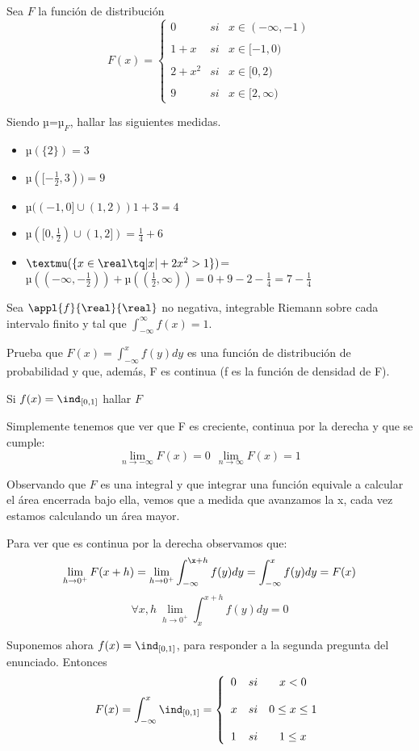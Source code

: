 \begin{problem}
Sea $F$ la función de distribución
\[F(x)=\left\{ \begin{array}{lcc}
             0 &   si  & x \in (-\infty, -1) \\
             \\ 1+x & si & x \in [-1, 0) \\
             \\ 2+x^2 & si & x \in [0, 2) \\
             \\ 9 &  si  & x \in [2, \infty)
             \end{array}
   \right.\]

Siendo µ=$µ_F$, hallar las siguientes medidas.
\solution
\begin{itemize}
\item $µ(\{2\}) = 3 $
\item $µ([-\frac{1}{2}, 3)) = 9 $
\item $µ((-1,0]\cup (1,2)) 1 + 3 = 4$
\item $µ([0, \frac{1}{2}) \cup (1, 2]) = \frac{1}{4} + 6$
\item $µ(\{x \in \real \tq |x|+2x^2 > 1\})$=$µ((-\infty, -\frac{1}{2})) + µ((\frac{1}{2}, \infty)) = 0 + 9 - 2 - \frac{1}{4} = 7 - \frac{1}{4}$
\end{itemize}
\end{problem}

\begin{problem}
Sea $\appl{f}{\real}{\real}$ no negativa, integrable Riemann sobre cada intervalo finito y tal que $\int_{-\infty}^{\infty}f(x)=1$.

Prueba que $F(x)=\int_{-\infty}^x f(y) dy$ es una función de distribución de probabilidad y que, además, F es continua (f es la función de densidad de F).

Si $f(x)=\ind_{[0,1]}$ hallar $F$

\solution
Simplemente tenemos que ver que F es creciente, continua por la derecha y que se cumple:
\[\lim_{n \to - \infty}F(x)=0 \ \ \lim_{n \to \infty}F(x)=1\]

Observando que $F$ es una integral y que integrar una función equivale a calcular el área encerrada bajo ella, vemos que a medida que avanzamos la x, cada vez estamos calculando un área mayor.

Para ver que es continua por la derecha observamos que:
\[\lim_{h \to 0^+}F(x+h)=\lim_{h \to 0^+} \int_{-\infty}^{\x+h}f(y)dy = \int_{-\infty}^xf(y)dy = F(x)\]
\[\forall x, h \ \lim_{h \to 0^+}\int_{x}^{x+h}f(y)dy=0\]

Suponemos ahora $f(x)=\ind_{[0,1]}$, para responder a la segunda pregunta del enunciado. Entonces
\[F(x)= \int_{-\infty}^{x} \ind_{[0,1]} = \left\{ \begin{array}{lcc}
             0 &   si  & x < 0 \\
             \\ x & si &  0 \leq x \leq 1 \\
             \\ 1 &  si  & 1 \leq x
             \end{array}
   \right.\]
\end{problem}

